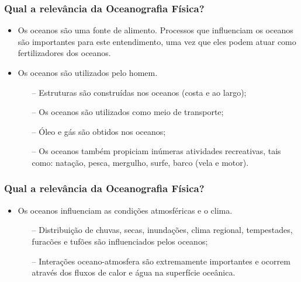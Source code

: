 \begin{frame}
    \frametitle{Qual a relevância da Oceanografia Física?}
    \begin{itemize}[<+-| alert@+>]
        \item Os oceanos são uma fonte de alimento.  Processos que influenciam
              os oceanos são importantes para este entendimento, uma vez que
              eles podem atuar como fertilizadores dos oceanos.
        \item Os oceanos são utilizados pelo homem.
            \begin{enumerate}[<+-| alert@+>]
                \item[--] Estruturas são construídas nos oceanos (costa e ao largo);
                \item[--] Os oceanos são utilizados como meio de transporte;
                \item[--] Óleo e gás são obtidos nos oceanos;
                \item[--] Os oceanos também propiciam inúmeras atividades recreativas,
                          tais como: natação, pesca, mergulho, surfe, barco (vela e motor).

            \end{enumerate}
    \end{itemize}
\end{frame}

\begin{frame}
    \frametitle{Qual a relevância da Oceanografia Física?}
    \begin{itemize}[<+-| alert@+>]
        \item Os oceanos influenciam as condições atmosféricas e o clima.
            \begin{enumerate}[<+-| alert@+>]
                \item[--] Distribuição de chuvas, secas, inundações, clima regional,
                          tempestades, furacões e tufões são influenciados pelos oceanos;
                \item[--] Interações oceano-atmosfera são extremamente importantes e
                          ocorrem através dos fluxos de calor e água na superfície oceânica.
            \end{enumerate}
    \end{itemize}
\end{frame}

